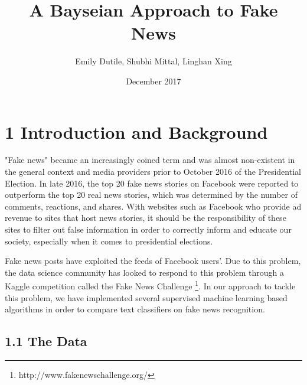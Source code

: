 \documentclass{neu_handout}
\title{A Bayseian Approach to Fake News}
\author{Emily Dutile, Shubhi Mittal, Linghan Xing}
\date{December 2017}
\begin{document}
\section*{1 Introduction and Background}

"Fake news" became an increasingly coined term and was almost non-existent in the general context and media providers prior to October 2016 of the Presidential Election. In late 2016, the top 20 fake news stories on Facebook were reported to outperform the top 20 real news stories, which was determined by the number of comments, reactions, and shares. With websites such as Facebook who provide ad revenue to sites that host news stories, it should be the responsibility of these sites to filter out false information in order to correctly inform and educate our society, especially when it comes to presidential elections.

\begin{figure}[h]
\centering
{}
\end{figure}

Fake news posts have exploited the feeds of Facebook users'. Due to this problem, the data science community has looked to respond to this problem through a Kaggle competition called the Fake News Challenge \footnote{http://www.fakenewschallenge.org/}. In our approach to tackle this problem, we have implemented several supervised machine learning based algorithms in order to compare text classifiers on fake news recognition.


\subsection*{1.1 The Data}
\end{document}
